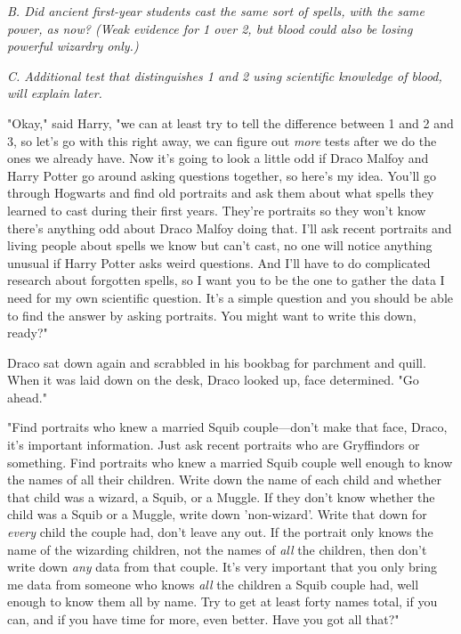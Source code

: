 \emph{B. Did ancient first-year students cast the same sort of spells, with the 
same power, as now? (Weak evidence for 1 over 2, but blood could also be losing 
powerful wizardry only.)}

\emph{C. Additional test that distinguishes 1 and 2 using scientific knowledge 
of blood, will explain later.}

"Okay," said Harry, "we can at least try to tell the difference between 1 and 2 
and 3, so let's go with this right away, we can figure out \emph{more} tests 
after we do the ones we already have. Now it's going to look a little odd if 
Draco Malfoy and Harry Potter go around asking questions together, so here's my 
idea. You'll go through Hogwarts and find old portraits and ask them about what 
spells they learned to cast during their first years. They're portraits so they 
won't know there's anything odd about Draco Malfoy doing that. I'll ask recent 
portraits and living people about spells we know but can't cast, no one will 
notice anything unusual if Harry Potter asks weird questions. And I'll have to 
do complicated research about forgotten spells, so I want you to be the one to 
gather the data I need for my own scientific question. It's a simple question 
and you should be able to find the answer by asking portraits. You might want 
to write this down, ready?"

Draco sat down again and scrabbled in his bookbag for parchment and quill. When 
it was laid down on the desk, Draco looked up, face determined. "Go ahead."

"Find portraits who knew a married Squib couple---don't make that face, Draco, 
it's important information. Just ask recent portraits who are Gryffindors or 
something. Find portraits who knew a married Squib couple well enough to know 
the names of all their children. Write down the name of each child and whether 
that child was a wizard, a Squib, or a Muggle. If they don't know whether the 
child was a Squib or a Muggle, write down 'non-wizard'. Write that down for 
\emph{every} child the couple had, don't leave any out. If the portrait only 
knows the name of the wizarding children, not the names of \emph{all} the 
children, then don't write down \emph{any} data from that couple. It's very 
important that you only bring me data from someone who knows \emph{all} the 
children a Squib couple had, well enough to know them all by name. Try to get 
at least forty names total, if you can, and if you have time for more, even 
better. Have you got all that?"

